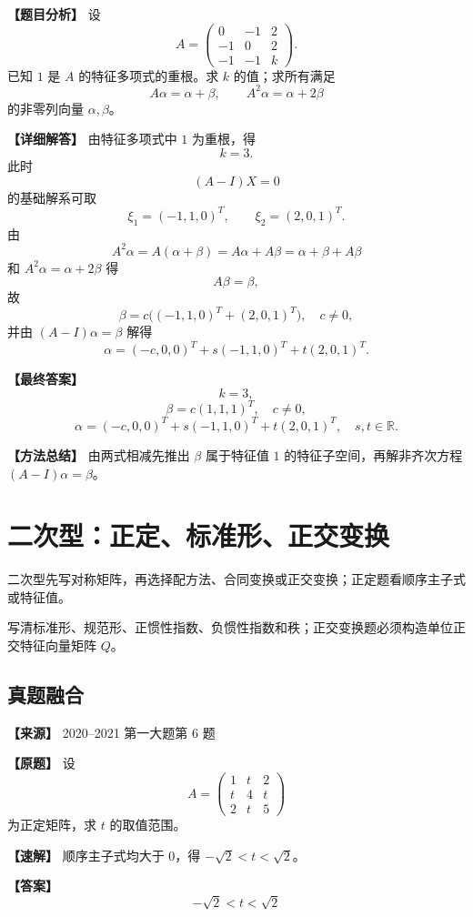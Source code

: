 \documentclass[11pt,a4paper,UTF8]{ctexart}
\begin{document}
\begin{answerbox}
\textbf{【题目分析】} 设
\[
A=\begin{pmatrix}0&-1&2\\-1&0&2\\-1&-1&k\end{pmatrix}.
\]
已知 $1$ 是 $A$ 的特征多项式的重根。求 $k$ 的值；求所有满足
\[
A\alpha=\alpha+\beta,\qquad A^2\alpha=\alpha+2\beta
\]
的非零列向量 $\alpha,\beta$。

\textbf{【详细解答】} 由特征多项式中 $1$ 为重根，得
\[
k=3.
\]
此时
\[
(A-I)X=0
\]
的基础解系可取
\[
\xi_1=(-1,1,0)^T,\qquad \xi_2=(2,0,1)^T.
\]
由
\[
A^2\alpha=A(\alpha+\beta)=A\alpha+A\beta=\alpha+\beta+A\beta
\]
和 $A^2\alpha=\alpha+2\beta$ 得
\[
A\beta=\beta,
\]
故
\[
\beta=c\bigl((-1,1,0)^T+(2,0,1)^T\bigr),\quad c\ne0,
\]
并由 $(A-I)\alpha=\beta$ 解得
\[
\alpha=(-c,0,0)^T+s(-1,1,0)^T+t(2,0,1)^T.
\]

\textbf{【最终答案】}
\[
k=3,
\]
\[
\beta=c(1,1,1)^T,\quad c\ne0,
\]
\[
\alpha=(-c,0,0)^T+s(-1,1,0)^T+t(2,0,1)^T,\quad s,t\in\mathbb R.
\]

\textbf{【方法总结】} 由两式相减先推出 $\beta$ 属于特征值 $1$ 的特征子空间，再解非齐次方程 $(A-I)\alpha=\beta$。
\end{answerbox}


\section{二次型：正定、标准形、正交变换}

\begin{identifybox}[识别]
二次型先写对称矩阵，再选择配方法、合同变换或正交变换；正定题看顺序主子式或特征值。
\end{identifybox}
\begin{templatebox}[考场模板]
写清标准形、规范形、正惯性指数、负惯性指数和秩；正交变换题必须构造单位正交特征向量矩阵 $Q$。
\end{templatebox}

\subsection{真题融合}

\begin{answerbox}
\textbf{【来源】} 2020--2021 第一大题第 6 题

\textbf{【原题】}
设
\[
A=\begin{pmatrix}1&t&2\\t&4&t\\2&t&5\end{pmatrix}
\]
为正定矩阵，求 $t$ 的取值范围。

\textbf{【速解】}
顺序主子式均大于 $0$，得 $-\sqrt2<t<\sqrt2$。

\textbf{【答案】}
\[-\sqrt2<t<\sqrt2\]
\end{answerbox}
\end{document}
